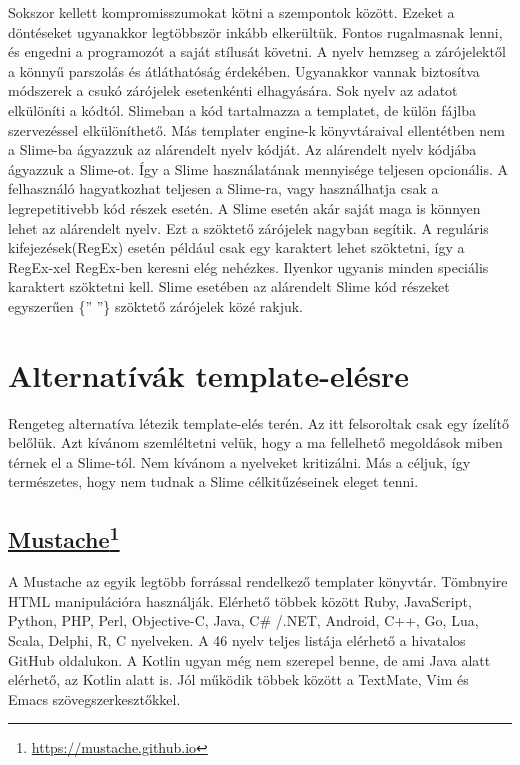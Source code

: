 Sokszor kellett kompromisszumokat kötni a szempontok között. 
Ezeket a döntéseket ugyanakkor legtöbbször inkább elkerültük. 
Fontos rugalmasnak lenni, és engedni a programozót a saját stílusát követni. 
A nyelv hemzseg a zárójelektől a könnyű parszolás és átláthatóság érdekében.
Ugyanakkor vannak biztosítva módszerek a csukó zárójelek esetenkénti elhagyására.
Sok nyelv az adatot elkülöníti a kódtól. 
Slimeban a kód tartalmazza a templatet, de külön fájlba szervezéssel elkülöníthető. 
Más templater engine-k könyvtáraival ellentétben nem a Slime-ba ágyazzuk az alárendelt nyelv kódját. 
Az alárendelt nyelv kódjába ágyazzuk a Slime-ot. 
Így a Slime használatának mennyisége teljesen opcionális. 
A felhasználó hagyatkozhat teljesen a Slime-ra, vagy használhatja csak a legrepetitivebb kód részek esetén. 
A Slime esetén akár saját maga is könnyen lehet az alárendelt nyelv. 
Ezt a szöktető zárójelek nagyban segítik. 
A reguláris kifejezések(RegEx) esetén például csak egy karaktert lehet szöktetni, így a RegEx-xel RegEx-ben keresni elég nehézkes.
Ilyenkor ugyanis minden speciális karaktert szöktetni kell. 
Slime esetében az alárendelt Slime kód részeket egyszerűen \{” ”\} szöktető zárójelek közé rakjuk.


\section{Alternatívák template-elésre }
\label{sec:SAlternatives}
Rengeteg alternatíva létezik template-elés terén.
Az itt felsoroltak csak egy ízelítő belőlük.
Azt kívánom szemléltetni velük, hogy a ma fellelhető megoldások miben térnek el a Slime-tól.
Nem kívánom a nyelveket kritizálni.
Más a céljuk, így természetes, hogy nem tudnak a Slime célkitűzéseinek eleget tenni.

\subsection[Mustache]{\href{https://mustache.github.io}{Mustache}\footnote{\url{https://mustache.github.io}}}
\label{sec:mustache}
A Mustache az egyik legtöbb forrással rendelkező templater könyvtár.
Tömbnyire HTML manipulációra használják.
Elérhető többek között Ruby, JavaScript, Python, PHP, Perl, Objective-C, Java, C\# /.NET, Android, C++, Go, Lua, Scala, Delphi, R, C nyelveken.
A 46 nyelv teljes listája elérhető a hivatalos GitHub oldalukon.
A Kotlin ugyan még nem szerepel benne, de ami Java alatt elérhető, az Kotlin alatt is.
Jól működik többek között a TextMate, Vim és Emacs szövegszerkesztőkkel.

